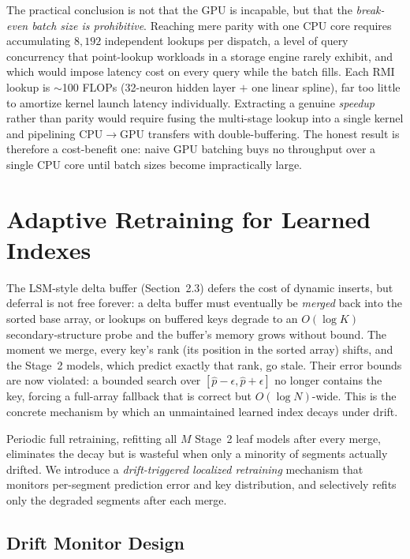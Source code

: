 \documentclass[sigconf, nonacm]{acmart}
\begin{document}
The practical conclusion is not that the GPU is incapable, but that the \textit{break-even batch size is prohibitive}. Reaching mere parity with one CPU core requires accumulating $8{,}192$ independent lookups per dispatch, a level of query concurrency that point-lookup workloads in a storage engine rarely exhibit, and which would impose latency cost on every query while the batch fills. Each RMI lookup is $\sim$100 FLOPs (32-neuron hidden layer $+$ one linear spline), far too little to amortize kernel launch latency individually. Extracting a genuine \textit{speedup} rather than parity would require fusing the multi-stage lookup into a single kernel and pipelining CPU$\to$GPU transfers with double-buffering. The honest result is therefore a cost-benefit one: naive GPU batching buys no throughput over a single CPU core until batch sizes become impractically large.

\section{Adaptive Retraining for Learned Indexes}

The LSM-style delta buffer (Section~2.3) defers the cost of dynamic inserts, but deferral is not free forever: a delta buffer must eventually be \textit{merged} back into the sorted base array, or lookups on buffered keys degrade to an $O(\log K)$ secondary-structure probe and the buffer's memory grows without bound. The moment we merge, every key's rank (its position in the sorted array) shifts, and the Stage~2 models, which predict exactly that rank, go stale. Their error bounds are now violated: a bounded search over $[\hat{p}-\epsilon,\hat{p}+\epsilon]$ no longer contains the key, forcing a full-array fallback that is correct but $O(\log N)$-wide. This is the concrete mechanism by which an unmaintained learned index decays under drift.

Periodic full retraining, refitting all $M$ Stage~2 leaf models after every merge, eliminates the decay but is wasteful when only a minority of segments actually drifted. We introduce a \textit{drift-triggered localized retraining} mechanism that monitors per-segment prediction error and key distribution, and selectively refits only the degraded segments after each merge.

\subsection{Drift Monitor Design}
\end{document}
